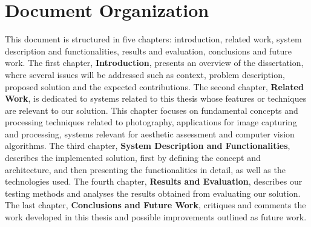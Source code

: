 \section{Document Organization}
\label{sec:aperture}

This document is structured in five chapters: introduction, related work, system description and functionalities, results and evaluation, conclusions and future work.
The first chapter, \textbf{Introduction}, presents an overview of the dissertation, where several issues will be addressed such as context, problem description, proposed solution and the expected contributions. The second chapter, \textbf{Related Work}, is dedicated to systems related to this thesis whose features or techniques are relevant to our solution. This chapter focuses on fundamental concepts and processing techniques related to photography, applications for image capturing and processing, systems relevant for aesthetic assessment and computer vision algorithms.
The third chapter, \textbf{System Description and Functionalities}, describes the implemented solution, first by defining the concept and architecture, and then presenting the functionalities in detail, as well as the technologies used. The fourth chapter, \textbf{Results and Evaluation}, describes our testing methods and analyses the results obtained from evaluating our solution. The last chapter, \textbf{Conclusions and Future Work}, critiques and comments the work developed in this thesis and possible improvements outlined as future work.